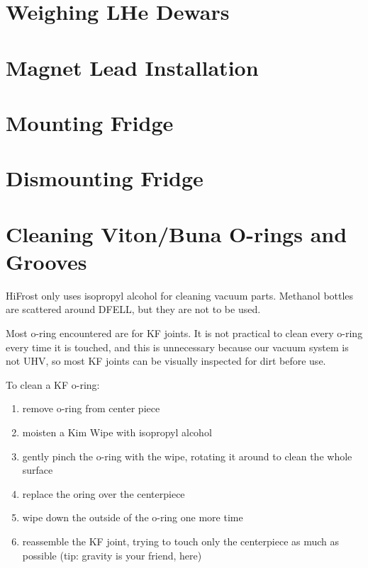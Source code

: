 \section{Weighing LHe Dewars}
\label{weigh-250LD}

\section{Magnet Lead Installation}

\section{Mounting Fridge}

\section{Dismounting Fridge}

\section{Cleaning Viton/Buna O-rings and Grooves}

HiFrost only uses isopropyl alcohol for cleaning vacuum parts.  Methanol bottles are scattered around DFELL, but they are not to be used.

Most o-ring encountered are for KF joints.  It is not practical to clean every o-ring every time it is touched, and this is unnecessary because our vacuum system is not UHV, so most KF joints can be visually inspected for dirt before use.



To clean a KF o-ring:
\begin{enumerate}
 \item remove o-ring from center piece
 \item moisten a Kim Wipe with isopropyl alcohol
 \item gently pinch the o-ring with the wipe, rotating it around to clean the whole surface
 \item replace the oring over the centerpiece
 \item wipe down the outside of the o-ring one more time
 \item reassemble the KF joint, trying to touch only the centerpiece as much as possible (tip: gravity is your friend, here)
\end{enumerate}



